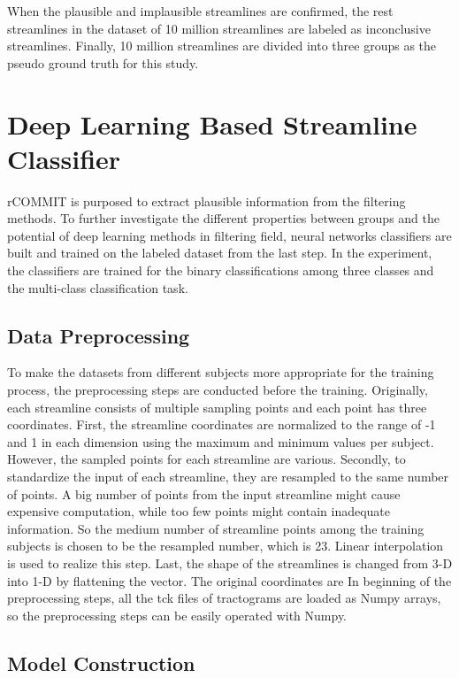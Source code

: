 When the plausible and implausible streamlines are confirmed, the rest streamlines in the dataset of 10 million streamlines are labeled 
as inconclusive streamlines. Finally, 10 million streamlines are divided into three groups as the pseudo ground truth for this study.

\section{Deep Learning Based Streamline Classifier}
rCOMMIT is purposed to extract plausible information from the filtering methods. To further investigate the different properties between groups and the potential
of deep learning methods in filtering field, neural networks classifiers are built and trained on the labeled dataset from the last step.
In the experiment, the classifiers are trained for the binary classifications among three classes and the multi-class classification task.

\subsection{Data Preprocessing}
To make the datasets from different subjects more appropriate for the training process, the preprocessing steps are conducted before the training.
Originally, each streamline consists of multiple sampling points and each point has three coordinates. 
First, the streamline coordinates are normalized to the range of -1 and 1 in each dimension using the maximum and minimum values per subject.
However, the sampled points for each streamline are various. Secondly, to standardize the input of each streamline, they are resampled to the same 
number of points. A big number of points from the input streamline might cause expensive computation, while too few points might contain 
inadequate information. So the medium number of streamline points among the training subjects is chosen to be the resampled number, which is 23.
Linear interpolation is used to realize this step. Last, the shape of the streamlines is changed from 3-D into 1-D by flattening the vector. 
The original coordinates are 
In beginning of the preprocessing steps, all the tck files of tractograms are loaded as Numpy arrays, 
so the preprocessing steps can be easily operated with Numpy. 

\subsection{Model Construction}

